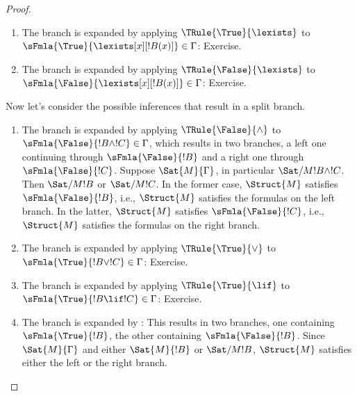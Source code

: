 \begin{proof}
\begin{enumerate}
  By , $\Sat/{M}{\lforall[x][!B(x)]}$
  iff for some $s$, $\Sat/{M}{!B(x)}[s]$. Now let $\Struct{M'}$ be
  just like $\Struct{M}$, except $\Assign{a}{M'} = s(x)$.  By
  , for any
  $\sFmla{\True}{!C} \in \Gamma$, $\Sat{M'}{!C}$, and for any
  $\sFmla{\False}{!C} \in \Gamma$, $\Sat/{M'}{!C}$, since $a$ does not
  occur in~$\Gamma$.

  By , $\Sat/{M'}{!A(x)}[s]$.  By
  , $\Sat/{M'}{!A(a)}[s]$.  Since
  $!A(a)$ is !!a{sentence}, by
  , $\Sat/{M'}{!A(a)}$, i.e.,
  $\Struct{M'}$ satisfies $\sFmla{\False}{!A(a)}$.
\item The branch is expanded by applying $\TRule{\True}{\lexists}$ to
  $\sFmla{\True}{\lexists[x][!B(x)]} \in \Gamma$: Exercise.
\item The branch is expanded by applying $\TRule{\False}{\lexists}$ to
  $\sFmla{\False}{\lexists[x][!B(x)]} \in \Gamma$: Exercise.
\end{enumerate}
Now let's consider the possible inferences that result in a split branch.
\begin{enumerate}
\item The branch is expanded by applying $\TRule{\False}{\land}$ to
  $\sFmla{\False}{!B \land !C} \in \Gamma$, which results in two
  branches, a left one continuing through $\sFmla{\False}{!B}$ and a
  right one through $\sFmla{\False}{!C}$. Suppose
  $\Sat{M}{\Gamma}$, in particular
  $\Sat/{M}{!B \land !C}$.  Then
  $\Sat/{M}{!B}$ or
  $\Sat/{M}{!C}$. In the former case,
  $\Struct{M}$ satisfies
  $\sFmla{\False}{!B}$, i.e., $\Struct{M}$
  satisfies the formulas on the left branch. In the latter,
  $\Struct{M}$ satisfies
  $\sFmla{\False}{!C}$, i.e., $\Struct{M}$
  satisfies the formulas on the right branch.
\item The branch is expanded by applying $\TRule{\True}{\lor}$ to
  $\sFmla{\True}{!B \lor !C} \in \Gamma$: Exercise.
\item The branch is expanded by applying $\TRule{\True}{\lif}$ to
  $\sFmla{\True}{!B \lif !C} \in \Gamma$: Exercise.
\item The branch is expanded by \Cut: This results in two branches,
  one containing $\sFmla{\True}{!B}$, the other containing
  $\sFmla{\False}{!B}$. Since $\Sat{M}{\Gamma}$
  and either $\Sat{M}{!B}$ or
  $\Sat/{M}{!B}$,
  $\Struct{M}$ satisfies either the left or
  the right branch.
\end{enumerate}
\end{proof}


